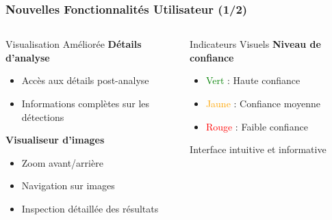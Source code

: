 \documentclass[
	11pt,
	aspectratio=169,
]{beamer}
\begin{document}

\begin{frame}
	\frametitle{Nouvelles Fonctionnalités Utilisateur (1/2)}
	
	\begin{columns}[t]
		\begin{column}{0.48\textwidth}
			\begin{block}{Visualisation Améliorée}
				\textbf{Détails d'analyse}
				\begin{itemize}
					\item Accès aux détails post-analyse
					\item Informations complètes sur les détections
				\end{itemize}
				
				\bigskip
				
				\textbf{Visualiseur d'images}
				\begin{itemize}
					\item Zoom avant/arrière
					\item Navigation sur images
					\item Inspection détaillée des résultats
				\end{itemize}
			\end{block}
		\end{column}
		
		\begin{column}{0.48\textwidth}
			\begin{block}{Indicateurs Visuels}
				\textbf{Niveau de confiance}
				\begin{itemize}
					\item \textcolor{green}{Vert} : Haute confiance
					\item \textcolor{orange}{Jaune} : Confiance moyenne
					\item \textcolor{red}{Rouge} : Faible confiance
				\end{itemize}
				
				\bigskip
				
				\alert{Interface intuitive et informative}
			\end{block}
		\end{column}
	\end{columns}
\end{frame}

\end{document}
